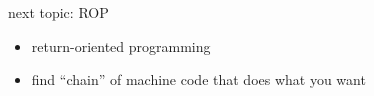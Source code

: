 \begin{frame}{next topic: ROP}
    \begin{itemize}
    \item return-oriented programming
    \vspace{.5cm}
    \item find ``chain'' of machine code that does what you want
    \end{itemize}
\end{frame}
